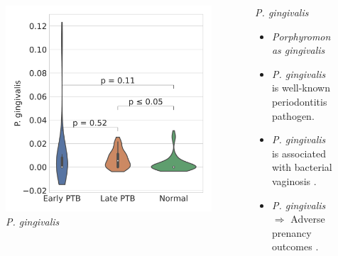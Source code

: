 \documentclass{beamer}
\begin{document}
\begin{frame}[allowframebreaks]
        \begin{columns}
            \begin{column}{0.4 \linewidth}
                \begin{figure}
                    \includegraphics[width=\linewidth]{figures/Step71_Proportion/everything.DADA2.homd.Mouth/P. gingivalis.pdf}
                    \caption{\textit{P. gingivalis}}
                \end{figure}
            \end{column}
            \begin{column}{0.6 \linewidth}
                \begin{block}{\textit{P. gingivalis}}
                    \begin{itemize}
                        \item \textit{Porphyromonas gingivalis}
                        \item \textit{P. gingivalis} is well-known periodontitis pathogen.
                        \item \textit{P. gingivalis} is associated with bacterial vaginosis \cite{Porphyromonas-1}.
                        \item \textit{P. gingivalis} $\Rightarrow$ Adverse prenancy outcomes \cite{Porphyromonas-2}.
                    \end{itemize}
                \end{block}
            \end{column}
        \end{columns}


\end{frame}
\end{document}
